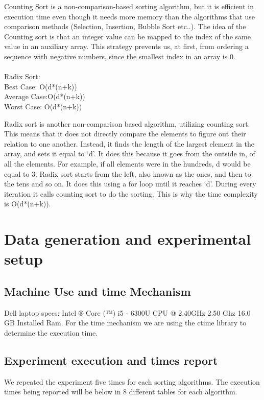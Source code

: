 \documentclass[12pt]{article}
\begin{document}
	Counting Sort is a non-comparison-based sorting algorithm, but it is efficient in execution time even though it needs more memory than the algorithms that use comparison methods (Selection, Insertion, Bubble Sort etc..). The idea of the Counting sort is that an integer value can be mapped to the index of the same value in an auxiliary array. This strategy prevents us, at first, from ordering a sequence with negative numbers, since the smallest index in an array is 0.\\
	\\
	
	\indent Radix Sort:\\
	
	\indent Best Case: O(d*(n+k))\\
	\indent Average Case:O(d*(n+k))\\
	\indent Worst Case: O(d*(n+k))
	
	Radix sort is another non-comparison based algorithm, utilizing counting sort. This means that it does not directly compare the elements to figure out their relation to one another. Instead, it finds the length of the largest element in the array, and sets it equal to ‘d’. It does this because it goes from the outside in, of all the elements. For example, if all elements were in the hundreds, d would be equal to 3. Radix sort starts from the left, also known as the ones, and then to the tens and so on. It does this using a for loop until it reaches ‘d’. During every iteration it calls counting sort to do the sorting. This is why the time complexity is O(d*(n+k)).\\	
	
	\section{Data generation and experimental setup}
	\subsection{Machine Use and time Mechanism}
	Dell laptop specs: Intel ® Core (™) i5 - 6300U CPU @ 2.40GHz 2.50 Ghz 16.0 GB Installed Ram. For the time mechanism we are using the ctime library to determine the execution time.
	\subsection{Experiment execution and times report}
	We repeated the experiment five times for each sorting algorithms.
	The execution times being reported will be below in 8 different tables for each algorithm. 
\end{document}
